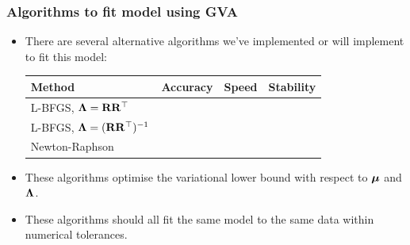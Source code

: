 \documentclass{beamer}
\begin{document}
\begin{frame}
	\frametitle{Algorithms to fit model using GVA}
	\begin{itemize}
		\item There are several alternative algorithms we've implemented or will implement
		      to fit this model:
		      \begin{tabular}{|l|ccc|}
		      	\hline
		      	Method                                   & Accuracy   & Speed      & Stability  \\
		      	\hline
		      	L-BFGS, ${\boldsymbol \Lambda} = {\bf R} {\bf R}^\top$        & \checkmark &            & \checkmark \\
		      	L-BFGS, ${\boldsymbol \Lambda} = ({\bf R} {\bf R}^\top)^{-1}$ & \checkmark & \checkmark & \checkmark \\
		      	Newton-Raphson                           & \checkmark & \checkmark &            \\
		      	\hline
		      \end{tabular}	
		\item These algorithms optimise the variational lower bound with respect to
		      ${\boldsymbol \mu}$ and ${\boldsymbol \Lambda}$.
		\item These algorithms should all fit the same model to the same data
		      within numerical tolerances.
	\end{itemize}
\end{frame}
\end{document}
